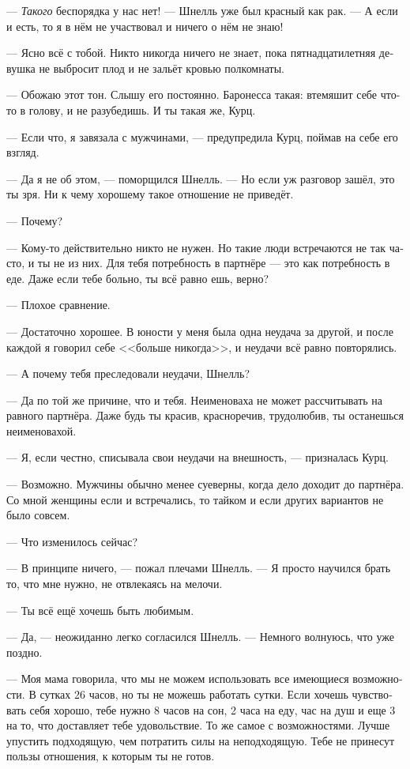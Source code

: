 \documentclass[a4paper,12pt,fleqn]{book}\usepackage{cooltooltips}\usepackage{polyglossia}\setdefaultlanguage[babelshorthands=true]{russian}\setotherlanguage{english}\defaultfontfeatures{Ligatures=TeX,Mapping=tex-text} \usepackage{xcolor}\definecolor{lightgray}{HTML}{bbbbbb}\color{lightgray}\newcommand{\ml}[3]{\textenglish{\textcolor{black}{#3}}}
\begin{document}
--- \emph{Такого} беспорядка у нас нет! --- Шнелль уже был красный как рак.
--- А если и есть, то я в нём не участвовал и ничего о нём не знаю!

--- Ясно всё с тобой.
Никто никогда ничего не знает, пока пятнадцатилетняя девушка не выбросит плод и не зальёт кровью полкомнаты.

--- Обожаю этот тон.
Слышу его постоянно.
Баронесса такая: втемяшит себе что-то в голову, и не разубедишь.
И ты такая же, Курц.

--- Если что, я завязала с мужчинами, --- предупредила Курц, поймав на себе его взгляд.

--- Да я не об этом, --- поморщился Шнелль.
--- Но если уж разговор зашёл, это ты зря.
Ни к чему хорошему такое отношение не приведёт.

--- Почему?

--- Кому-то действительно никто не нужен.
Но такие люди встречаются не так часто, и ты не из них.
Для тебя потребность в партнёре --- это как потребность в еде.
Даже если тебе больно, ты всё равно ешь, верно?

--- Плохое сравнение.

--- Достаточно хорошее.
В юности у меня была одна неудача за другой, и после каждой я говорил себе <<больше никогда>>, и неудачи всё равно повторялись.

--- А почему тебя преследовали неудачи, Шнелль?

--- Да по той же причине, что и тебя.
Неименоваха не может рассчитывать на равного партнёра.
Даже будь ты красив, красноречив, трудолюбив, ты останешься неименовахой.

--- Я, если честно, списывала свои неудачи на внешность, --- призналась Курц.

--- Возможно.
Мужчины обычно менее суеверны, когда дело доходит до партнёра.
Со мной женщины если и встречались, то тайком и если других вариантов не было совсем.

--- Что изменилось сейчас?

--- В принципе ничего, --- пожал плечами Шнелль.
--- Я просто научился брать то, что мне нужно, не отвлекаясь на мелочи.

--- Ты всё ещё хочешь быть любимым.

--- Да, --- неожиданно легко согласился Шнелль.
--- Немного волнуюсь, что уже поздно.

--- Моя мама говорила, что мы не можем использовать все имеющиеся возможности.
В сутках 26 часов, но ты не можешь работать сутки.
Если хочешь чувствовать себя хорошо, тебе нужно 8 часов на сон, 2 часа на еду, час на душ и еще 3 на то, что доставляет тебе удовольствие.
То же самое с возможностями.
Лучше упустить подходящую, чем потратить силы на неподходящую.
Тебе не принесут пользы отношения, к которым ты не готов.
\end{document}
